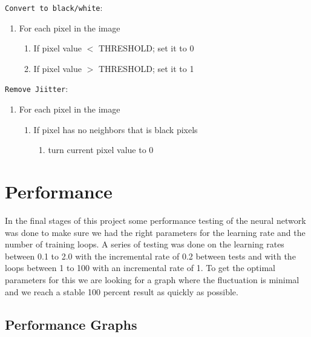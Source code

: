 \documentclass[a4paper, 12pt]{article}
\begin{document}
\verb|Convert to black/white|:
\begin{enumerate}
\item For each pixel in the image
	\begin{enumerate}
	\item If pixel value $<$ THRESHOLD; set it to 0
    \item If pixel value $>$ THRESHOLD; set it to 1
	\end{enumerate}
\end{enumerate}

\verb|Remove Jiitter|:
\begin{enumerate}
\item For each pixel in the image
	\begin{enumerate}
	\item If pixel has no neighbors that is black pixels
    	\begin{enumerate}
        	\item turn current pixel value to 0
        \end{enumerate}
	\end{enumerate}
\end{enumerate}

\clearpage\section{Performance}
In the final stages of this project some performance testing of the neural network was done to make sure we had the right parameters for the learning rate and the number of training loops. A series of testing was done on the learning rates between 0.1 to 2.0 with the incremental rate of 0.2 between tests and with the loops between 1 to 100 with an incremental rate of 1. To get the optimal parameters for this we are looking for a graph where the fluctuation is minimal and we reach a stable 100 percent result as quickly as possible.
\subsection{Performance Graphs}

\textbf{}
\end{document}
